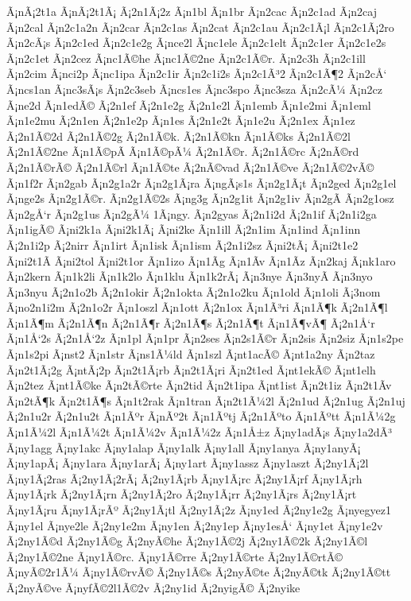 {Ã¡nÃ¡2t1a
Ã¡nÃ¡2t1Ã¡
Ã¡2n1Ã¡2z
Ã¡n1bl
Ã¡n1br
Ã¡n2cac
Ã¡n2c1ad
Ã¡n2caj
Ã¡n2cal
Ã¡n2c1a2n
Ã¡n2car
Ã¡n2c1as
Ã¡n2cat
Ã¡n2c1au
Ã¡n2c1Ã¡l
Ã¡n2c1Ã¡2ro
Ã¡n2cÃ¡s
Ã¡n2c1ed
Ã¡n2c1e2g
Ã¡nce2l
Ã¡nc1ele
Ã¡n2c1elt
Ã¡n2c1er
Ã¡n2c1e2s
Ã¡n2c1et
Ã¡n2cez
Ã¡nc1Ã©he
Ã¡nc1Ã©2ne
Ã¡n2c1Ã©r.
Ã¡n2c3h
Ã¡n2c1ill
Ã¡n2cim
Ã¡nci2p
Ã¡nc1ipa
Ã¡n2c1ir
Ã¡n2c1i2s
Ã¡n2c1Ã³2
Ã¡n2c1Ã¶2
Ã¡n2cÅ‘
Ã¡ncs1an
Ã¡nc3sÃ¡s
Ã¡n2c3seb
Ã¡ncs1es
Ã¡nc3spo
Ã¡nc3sza
Ã¡n2cÃ¼
Ã¡n2cz
Ã¡ne2d
Ã¡n1edÃ©
Ã¡2n1ef
Ã¡2n1e2g
Ã¡2n1e2l
Ã¡n1emb
Ã¡n1e2mi
Ã¡n1eml
Ã¡n1e2mu
Ã¡2n1en
Ã¡2n1e2p
Ã¡n1es
Ã¡2n1e2t
Ã¡n1e2u
Ã¡2n1ex
Ã¡n1ez
Ã¡2n1Ã©2d
Ã¡2n1Ã©2g
Ã¡2n1Ã©k.
Ã¡2n1Ã©kn
Ã¡n1Ã©ks
Ã¡2n1Ã©2l
Ã¡2n1Ã©2ne
Ã¡n1Ã©pÃ­
Ã¡n1Ã©pÃ¼
Ã¡2n1Ã©r.
Ã¡2n1Ã©rc
Ã¡2nÃ©rd
Ã¡2n1Ã©rÃ©
Ã¡2n1Ã©rl
Ã¡n1Ã©te
Ã¡2nÃ©vad
Ã¡2n1Ã©ve
Ã¡2n1Ã©2vÃ©
Ã¡n1f2r
Ã¡n2gab
Ã¡n2g1a2r
Ã¡n2g1Ã¡ra
Ã¡ngÃ¡s1s
Ã¡n2g1Ã¡t
Ã¡n2ged
Ã¡n2g1el
Ã¡nge2s
Ã¡n2g1Ã©r.
Ã¡n2g1Ã©2s
Ã¡ng3g
Ã¡n2g1it
Ã¡n2g1iv
Ã¡n2gÃ­
Ã¡n2g1osz
Ã¡n2gÅ‘r
Ã¡n2g1us
Ã¡n2gÃ¼
1Ã¡ngy.
Ã¡n2gyas
Ã¡2n1i2d
Ã¡2n1if
Ã¡2n1i2ga
Ã¡n1igÃ©
Ã¡ni2k1a
Ã¡ni2k1Ã¡
Ã¡ni2ke
Ã¡n1ill
Ã¡2n1im
Ã¡n1ind
Ã¡n1inn
Ã¡2n1i2p
Ã¡2nirr
Ã¡n1irt
Ã¡n1isk
Ã¡n1ism
Ã¡2n1i2sz
Ã¡ni2tÃ¡
Ã¡ni2t1e2
Ã¡ni2t1Ã­
Ã¡ni2tol
Ã¡ni2t1or
Ã¡n1izo
Ã¡n1Ã­g
Ã¡n1Ã­v
Ã¡n1Ã­z
Ã¡n2kaj
Ã¡nk1aro
Ã¡n2kern
Ã¡n1k2li
Ã¡n1k2lo
Ã¡n1klu
Ã¡n1k2rÃ¡
Ã¡n3nye
Ã¡n3nyÃ­
Ã¡n3nyo
Ã¡n3nyu
Ã¡2n1o2b
Ã¡2n1okir
Ã¡2n1okta
Ã¡2n1o2ku
Ã¡n1old
Ã¡n1oli
Ã¡3nom
Ã¡no2n1i2m
Ã¡2n1o2r
Ã¡n1oszl
Ã¡n1ott
Ã¡2n1ox
Ã¡n1Ã³ri
Ã¡n1Ã¶k
Ã¡2n1Ã¶l
Ã¡n1Ã¶m
Ã¡2n1Ã¶n
Ã¡2n1Ã¶r
Ã¡2n1Ã¶s
Ã¡2n1Ã¶t
Ã¡n1Ã¶vÃ¶
Ã¡2n1Å‘r
Ã¡n1Å‘2s
Ã¡2n1Å‘2z
Ã¡n1pl
Ã¡n1pr
Ã¡n2ses
Ã¡n2s1Ã©r
Ã¡n2sis
Ã¡n2siz
Ã¡n1s2pe
Ã¡n1s2pi
Ã¡nst2
Ã¡n1str
Ã¡ns1Ã¼ld
Ã¡n1szl
Ã¡nt1acÃ©
Ã¡nt1a2ny
Ã¡n2taz
Ã¡n2t1Ã¡2g
Ã¡ntÃ¡2p
Ã¡n2t1Ã¡rb
Ã¡n2t1Ã¡ri
Ã¡n2t1ed
Ã¡nt1ekÃ©
Ã¡nt1elh
Ã¡n2tez
Ã¡nt1Ã©ke
Ã¡n2tÃ©rte
Ã¡n2tid
Ã¡n2t1ipa
Ã¡nt1ist
Ã¡n2t1iz
Ã¡n2t1Ã­v
Ã¡n2tÃ¶k
Ã¡n2t1Ã¶s
Ã¡n1t2rak
Ã¡n1tran
Ã¡n2t1Ã¼2l
Ã¡2n1ud
Ã¡2n1ug
Ã¡2n1uj
Ã¡2n1u2r
Ã¡2n1u2t
Ã¡n1Ãºr
Ã¡nÃº2t
Ã¡n1Ãºtj
Ã¡2n1Ãºto
Ã¡n1Ãºtt
Ã¡n1Ã¼2g
Ã¡n1Ã¼2l
Ã¡n1Ã¼2t
Ã¡n1Ã¼2v
Ã¡n1Ã¼2z
Ã¡n1Å±z
Ã¡ny1adÃ¡s
Ã¡ny1a2dÃ³
Ã¡ny1agg
Ã¡ny1akc
Ã¡ny1alap
Ã¡ny1alk
Ã¡ny1all
Ã¡ny1anya
Ã¡ny1anyÃ¡
Ã¡ny1apÃ¡
Ã¡ny1ara
Ã¡ny1arÃ¡
Ã¡ny1art
Ã¡ny1assz
Ã¡ny1aszt
Ã¡2ny1Ã¡2l
Ã¡ny1Ã¡2ras
Ã¡2ny1Ã¡2rÃ¡
Ã¡2ny1Ã¡rb
Ã¡ny1Ã¡rc
Ã¡2ny1Ã¡rf
Ã¡ny1Ã¡rh
Ã¡ny1Ã¡rk
Ã¡2ny1Ã¡rn
Ã¡2ny1Ã¡2ro
Ã¡2ny1Ã¡rr
Ã¡2ny1Ã¡rs
Ã¡2ny1Ã¡rt
Ã¡ny1Ã¡ru
Ã¡ny1Ã¡rÃº
Ã¡2ny1Ã¡tl
Ã¡2ny1Ã¡2z
Ã¡ny1ed
Ã¡2ny1e2g
Ã¡nyegyez1
Ã¡ny1el
Ã¡nye2le
Ã¡2ny1e2m
Ã¡ny1en
Ã¡2ny1ep
Ã¡ny1esÅ‘
Ã¡ny1et
Ã¡ny1e2v
Ã¡2ny1Ã©d
Ã¡2ny1Ã©g
Ã¡2nyÃ©he
Ã¡2ny1Ã©2j
Ã¡2ny1Ã©2k
Ã¡2ny1Ã©l
Ã¡2ny1Ã©2ne
Ã¡ny1Ã©rc.
Ã¡ny1Ã©rre
Ã¡2ny1Ã©rte
Ã¡2ny1Ã©rtÃ©
Ã¡nyÃ©2r1Ã¼
Ã¡ny1Ã©rvÃ©
Ã¡2ny1Ã©s
Ã¡2nyÃ©te
Ã¡2nyÃ©tk
Ã¡2ny1Ã©tt
Ã¡2nyÃ©ve
Ã¡nyfÃ©2l1Ã©2v
Ã¡2ny1id
Ã¡2nyigÃ©
Ã¡2nyike
}
